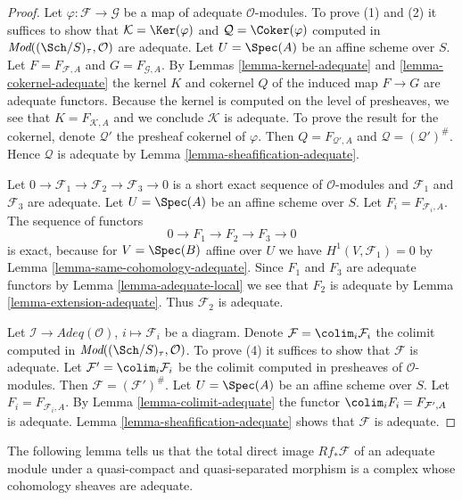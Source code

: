 \begin{proof}
Let $\varphi : \mathcal{F} \to \mathcal{G}$ be a map of adequate
$\mathcal{O}$-modules. To prove (1) and (2) it suffices to show that
$\mathcal{K} = \Ker(\varphi)$ and
$\mathcal{Q} = \Coker(\varphi)$ computed in
$\textit{Mod}((\Sch/S)_\tau, \mathcal{O})$ are adequate.
Let $U = \Spec(A)$ be an affine scheme over $S$.
Let $F = F_{\mathcal{F}, A}$ and $G = F_{\mathcal{G}, A}$.
By
Lemmas \ref{lemma-kernel-adequate} and
\ref{lemma-cokernel-adequate}
the kernel $K$ and cokernel $Q$ of the induced map
$F \to G$ are adequate functors.
Because the kernel is computed on the level of presheaves, we see
that $K = F_{\mathcal{K}, A}$ and we conclude $\mathcal{K}$ is adequate.
To prove the result for the cokernel, denote $\mathcal{Q}'$ the presheaf
cokernel of $\varphi$. Then $Q = F_{\mathcal{Q}', A}$ and
$\mathcal{Q} = (\mathcal{Q}')^\#$. Hence $\mathcal{Q}$
is adequate by
Lemma \ref{lemma-sheafification-adequate}.

\medskip\noindent
Let $0 \to \mathcal{F}_1 \to \mathcal{F}_2 \to \mathcal{F}_3 \to 0$
is a short exact sequence of $\mathcal{O}$-modules and
$\mathcal{F}_1$ and $\mathcal{F}_3$ are adequate.
Let $U = \Spec(A)$ be an affine scheme over $S$.
Let $F_i = F_{\mathcal{F}_i, A}$. The sequence of functors
$$
0 \to F_1 \to F_2 \to F_3 \to 0
$$
is exact, because for $V = \Spec(B)$ affine over $U$ we have
$H^1(V, \mathcal{F}_1) = 0$ by
Lemma \ref{lemma-same-cohomology-adequate}.
Since $F_1$ and $F_3$ are adequate functors by
Lemma \ref{lemma-adequate-local}
we see that $F_2$ is adequate by
Lemma \ref{lemma-extension-adequate}.
Thus $\mathcal{F}_2$ is adequate.

\medskip\noindent
Let $\mathcal{I} \to \textit{Adeq}(\mathcal{O})$, $i \mapsto \mathcal{F}_i$
be a diagram. Denote $\mathcal{F} = \colim_i \mathcal{F}_i$
the colimit computed in
$\textit{Mod}((\Sch/S)_\tau, \mathcal{O})$.
To prove (4) it suffices to show that $\mathcal{F}$ is adequate.
Let $\mathcal{F}' = \colim_i \mathcal{F}_i$ be the colimit computed
in presheaves of $\mathcal{O}$-modules. Then
$\mathcal{F} = (\mathcal{F}')^\#$.
Let $U = \Spec(A)$ be an affine scheme over $S$.
Let $F_i = F_{\mathcal{F}_i, A}$. By
Lemma \ref{lemma-colimit-adequate}
the functor $\colim_i F_i = F_{\mathcal{F}', A}$ is adequate.
Lemma \ref{lemma-sheafification-adequate}
shows that $\mathcal{F}$ is adequate.
\end{proof}

\noindent
The following lemma tells us that the total direct image
$Rf_*\mathcal{F}$ of an adequate module under a quasi-compact and
quasi-separated morphism is a complex whose cohomology sheaves
are adequate.

